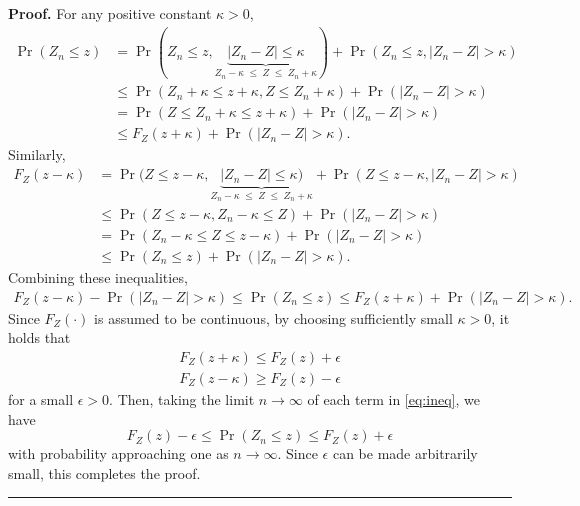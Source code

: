 \documentclass[10.5pt, A4paper, openany, uplatex]{book}
\newenvironment{proof}[1][Proof]{\textbf{#1.} }{\  \rule{0.5em}{0.5em}}
\numberwithin{equation}{section}
\begin{document}
\begin{proof}
	For any positive constant $\kappa > 0$,
	\begin{align*}
	\Pr(Z_n \le z) 
	& = \Pr(Z_n \le z, \underbrace{|Z_n - Z| \le \kappa}_{Z_n - \kappa \; \le \; Z \; \le \; Z_n + \kappa}) + \Pr(Z_n \le z, |Z_n - Z| > \kappa) \\
	& \le \Pr(Z_n + \kappa \le z + \kappa, Z \le Z_n + \kappa) + \Pr(|Z_n - Z| > \kappa) \\
	& = \Pr(Z \le Z_n + \kappa \le z + \kappa) + \Pr(|Z_n - Z| > \kappa) \\
	& \le F_Z(z + \kappa) + \Pr(|Z_n - Z| > \kappa).
	\end{align*}
	Similarly,
	\begin{align*}
	F_Z(z - \kappa)
	& = \Pr(Z \le z - \kappa, \underbrace{|Z_n - Z | \le \kappa)}_{Z_n - \kappa \; \le \; Z \; \le \; Z_n + \kappa} + \Pr(Z \le z - \kappa, |Z_n - Z| > \kappa) \\
	& \le \Pr(Z \le z - \kappa, Z_n - \kappa \le Z) + \Pr(|Z_n - Z| > \kappa) \\
	& = \Pr(Z_n - \kappa \le Z \le z - \kappa) + \Pr(|Z_n - Z| > \kappa) \\
	& \le \Pr(Z_n \le z) + \Pr(|Z_n - Z| > \kappa).
	\end{align*}
	Combining these inequalities,
	\begin{align}\label{eq:ineq}
	F_Z(z - \kappa) - \Pr(|Z_n - Z| > \kappa) \le \Pr(Z_n \le z) \le F_Z(z + \kappa) + \Pr(|Z_n - Z| > \kappa).
	\end{align}
	Since $F_Z(\cdot)$ is assumed to be continuous, by choosing sufficiently small $\kappa > 0$, it holds that 
	\begin{align*}
	F_Z(z + \kappa) \le  F_Z(z) + \epsilon \\
	F_Z(z - \kappa) \ge F_Z(z) - \epsilon
	\end{align*}
	for a small $\epsilon > 0$.
	Then, taking the limit $n \to \infty$ of each term in \eqref{eq:ineq}, we have
	\[
	F_Z(z) - \epsilon \le \Pr(Z_n \le z) \le F_Z(z) + \epsilon
	\]
	with probability approaching one as $n \to \infty$. 
	Since $\epsilon$ can be made arbitrarily small, this completes the proof.
\end{proof}
\bigskip
\end{document}
